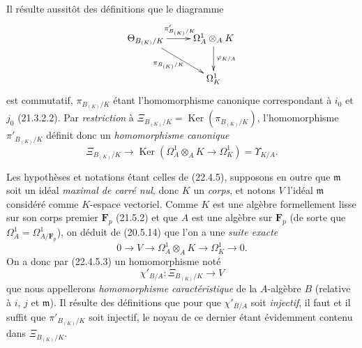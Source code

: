 \begin{env}[22.4.5]

Il résulte aussitôt des définitions que le diagramme
\[
  \xymatrix{
    \Theta_{B_{(K)}/K} \ar[r]^{\pi'_{B_{(K)}/K}} \ar[dr]_{\pi_{B_{(K)}/K}}
      & \Omega^1_A\otimes_AK \ar[d]^{\varphi_{K/A}} \\
    & \Omega^1_K
  }
\]
est commutatif, $\pi_{B_{(K)}/K}$ étant l'homomorphisme canonique
correspondant à $i_0$ et $j_0$ (21.3.2.2). Par \emph{restriction} à
$\Xi_{B_{(K)}/K}=\operatorname{Ker}(\pi_{B_{(K)}/K})$, l'homomorphisme
$\pi'_{B_{(K)}/K}$ définit donc un \emph{homomorphisme canonique}
\begin{equation}
\label{0.22.4.5.3-fr}
  \Xi_{B_{(K)}/K}\longrightarrow
  \operatorname{Ker}(\Omega^1_A\otimes_AK\longrightarrow\Omega^1_K)=\Upsilon_{K/A}.
  \tag{22.4.5.3}
\end{equation}
\end{env}

\begin{env}[22.4.6]
\label{0.22.4.6-fr}
Les hypothèses et notations étant celles de (22.4.5), supposons en outre que
$\mathfrak m$ soit un idéal \emph{maximal de carré nul}, donc $K$ un
\emph{corps}, et notons $V$ l'idéal $\mathfrak m$ considéré comme $K$-espace
vectoriel. Comme $K$ est une algèbre formellement lisse sur son corps premier
$\mathbf F_p$ (21.5.2) et que $A$ est une algèbre sur $\mathbf F_p$ (de sorte
que $\Omega^1_A=\Omega^1_{A/\mathbf F_p}$), on déduit de (20.5.14) que l'on a
une \emph{suite exacte}
\begin{equation}
\label{0.22.4.6.1-fr}
  0\longrightarrow V\longrightarrow\Omega^1_A\otimes_AK
  \longrightarrow\Omega^1_K\longrightarrow0.
  \tag{22.4.6.1}
\end{equation}
On a donc par (22.4.5.3) un homomorphisme noté
\begin{equation}
\label{0.22.4.6.2-fr}
  \chi'_{B/A}:\Xi_{B_{(K)}/K}\longrightarrow V
  \tag{22.4.6.2}
\end{equation}
que nous appellerons \emph{homomorphisme caractéristique} de la $A$-algèbre
$B$ (relative à $i$, $j$ et $\mathfrak m$). Il résulte des définitions que pour
que $\chi'_{B/A}$ soit \emph{injectif}, il faut et il suffit que
$\pi'_{B_{(K)}/K}$ soit injectif, le noyau de ce dernier étant évidemment
contenu dans $\Xi_{B_{(K)}/K}$.
\end{env}

